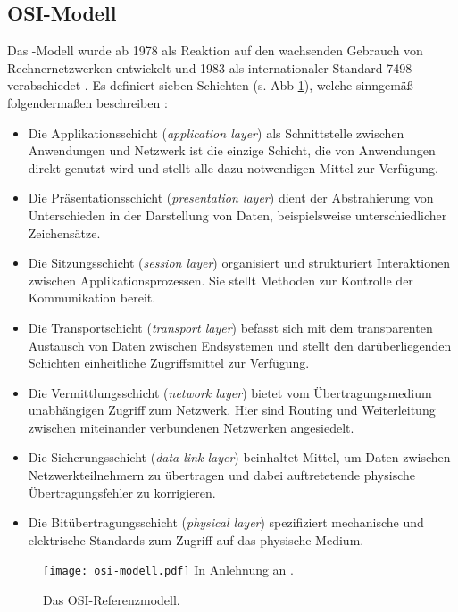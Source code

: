 \subsection{OSI-Modell}
Das -Modell wurde ab 1978 als Reaktion auf den wachsenden Gebrauch von Rechnernetzwerken entwickelt und 1983 als internationaler Standard  7498 verabschiedet \autocite[Vgl.][1334]{Day1983}. Es definiert sieben Schichten (s. Abb \ref{grafik:osi-modell}), welche \citeauthor{Day1983} sinngemäß folgendermaßen beschreiben \autocite[Vgl.][1334]{Day1983}:
\begin{itemize}
\item Die Applikationsschicht (\textit{application layer}) als Schnittstelle zwischen Anwendungen und Netzwerk ist die einzige Schicht, die von Anwendungen direkt genutzt wird und stellt alle dazu notwendigen Mittel zur Verfügung. 
\item Die Präsentationsschicht (\textit{presentation layer}) dient der Abstrahierung von Unterschieden in der Darstellung von Daten, beispielsweise unterschiedlicher Zeichensätze.
\item Die Sitzungsschicht (\textit{session layer}) organisiert und strukturiert Interaktionen zwischen Applikationsprozessen. Sie stellt Methoden zur Kontrolle der Kommunikation bereit.
\item Die Transportschicht (\textit{transport layer}) befasst sich mit dem transparenten Austausch von Daten zwischen Endsystemen und stellt den darüberliegenden Schichten einheitliche Zugriffsmittel zur Verfügung.
\item Die Vermittlungsschicht (\textit{network layer}) bietet vom Übertragungsmedium unabhängigen Zugriff zum Netzwerk. Hier sind Routing und Weiterleitung zwischen miteinander verbundenen Netzwerken angesiedelt.
\item Die Sicherungsschicht (\textit{data-link layer}) beinhaltet Mittel, um Daten zwischen Netzwerkteilnehmern zu übertragen und dabei auftretetende physische Übertragungsfehler zu korrigieren.
\item Die Bitübertragungsschicht (\textit{physical layer}) spezifiziert mechanische und elektrische Standards zum Zugriff auf das physische Medium.
\end{itemize}
\begin{figure}[tp]
    \centering
    \texttt{[image: osi-modell.pdf]}\linebreak
    In Anlehnung an \textcite[42]{Tanenbaum2010}.
    \caption{Das OSI-Referenzmodell.}
    \label{grafik:osi-modell}
\end{figure}
